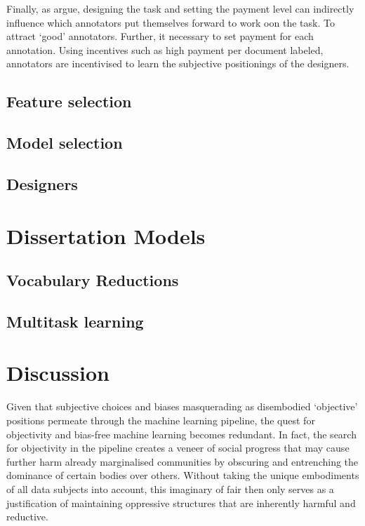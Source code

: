 Finally, as \citet{Sabou:2014} argue, designing the task and setting the payment level can indirectly influence which annotators put themselves forward to work oon the task. To attract `good' annotators. Further, it necessary to set payment for each annotation. Using incentives such as high payment per document labeled, annotators are incentivised to learn the subjective positionings of the designers.


\subsection{Feature selection}
\subsection{Model selection}
\subsection{Designers}

\section{Dissertation Models}

\subsection{Vocabulary Reductions}

\subsection{Multitask learning}

\section{Discussion}

Given that subjective choices and biases masquerading as disembodied `objective' positions permeate through the machine learning pipeline, the quest for objectivity and bias-free machine learning becomes redundant. In fact, the search for objectivity in the pipeline creates a veneer of social progress that may cause further harm already marginalised communities by obscuring and entrenching the dominance of certain bodies over others. Without taking the unique embodiments of all data subjects into account, this imaginary of fair then only serves as a justification of maintaining oppressive structures that are inherently harmful and reductive.

